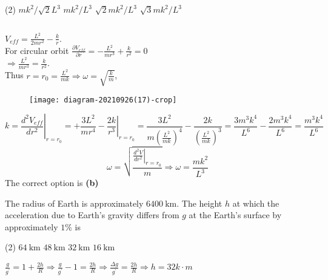 \begin{enumerate}
\begin{minipage}{\textwidth}
\end{minipage}
\begin{tasks}(2)
	\task[\textbf{A.}] $m k^{2} / \sqrt{2} L^{3}$
	\task[\textbf{B.}]$m k^{2} / L^{3}$
	\task[\textbf{C.}]$\sqrt{2} m k^{2} / L^{3}$
	\task[\textbf{D.}]$\sqrt{3} m k^{2} / L^{3}$
\end{tasks}
\begin{answer}$\left. \right. $\\
	\begin{minipage}{0.5\textwidth}
	$V_{e f f}=\frac{L^{2}}{2 m r^{2}}-\frac{k}{r} .$\\
	For circular orbit $\frac{\partial V_{e f f}}{\partial r}=-\frac{L^{2}}{m r^{3}}+\frac{k}{r^{2}}=0$ \\
	$\Rightarrow \frac{L^{2}}{m r^{3}}=\frac{k}{r^{2}} .$ \\
	Thus $r=r_{0}=\frac{L^{2}}{m k} \Rightarrow \omega=\sqrt{\frac{k}{m}}$,
	\end{minipage}
\begin{minipage}{0.5\textwidth}
\begin{figure}[H]
	\centering
	\texttt{[image: diagram-20210926(17)-crop]}
\end{figure}
\end{minipage}
 $$k=\left.\frac{d^{2} V_{e f f}}{d r^{2}}\right|_{r=r_{0}}=+\frac{3 L^{2}}{m r^{4}}-\left.\frac{2 k}{r^{3}}\right|_{r=r_{0}}=\frac{3 L^{2}}{m\left(\frac{L^{2}}{m k}\right)^{4}}-\frac{2 k}{\left(\frac{L^{2}}{m k}\right)^{3}}=\frac{3 m^{3} k^{4}}{L^{6}}-\frac{2 m^{3} k^{4}}{L^{6}}=\frac{m^{3} k^{4}}{L^{6}}$$
 $$\omega=\sqrt{\frac{\left.\frac{d^{2} V}{d r^{2}}\right|_{r=r_{0}}}{m}} \Rightarrow \omega=\frac{m k^{2}}{L^{3}}$$
 The correct option is \textbf{(b)}	
\end{answer}
\begin{minipage}{\textwidth}
\item The radius of Earth is approximately $6400 \mathrm{~km}$. The height $h$ at which the acceleration due to Earth's gravity differs from $g$ at the Earth's surface by approximately $1 \%$ is
\end{minipage}
\begin{tasks}(2)
	\task[\textbf{A.}] $64 \mathrm{~km}$
	\task[\textbf{B.}] $48 \mathrm{~km}$
	\task[\textbf{C.}]$32 \mathrm{~km}$
	\task[\textbf{D.}]$16 \mathrm{~km}$
\end{tasks}
\begin{answer}
$\frac{g}{g^{\prime}}=1+\frac{2 h}{R} \Rightarrow \frac{g}{g^{\prime}}-1=\frac{2 h}{R} \Rightarrow \frac{\Delta g}{g^{\prime}}=\frac{2 h}{R} \Rightarrow h=32 k \cdot m$\\

\end{answer}
\end{enumerate}

